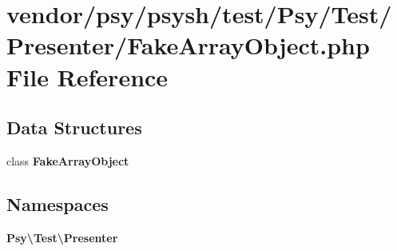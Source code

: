 \section{vendor/psy/psysh/test/\+Psy/\+Test/\+Presenter/\+Fake\+Array\+Object.php File Reference}
\label{_fake_array_object_8php}
\subsection*{Data Structures}
\begin{DoxyCompactItemize}
\item 
class {\bf Fake\+Array\+Object}
\end{DoxyCompactItemize}
\subsection*{Namespaces}
\begin{DoxyCompactItemize}
\item 
 {\bf Psy\textbackslash{}\+Test\textbackslash{}\+Presenter}
\end{DoxyCompactItemize}
